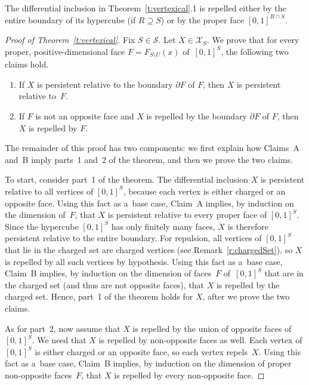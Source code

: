 \begin{Remark}
\label{r:chargedSet}
The dif\/ferential inclusion in Theorem~\ref{t:vertexical}.1 is repelled either by the entire boundary of its hypercube
(if $R\supseteq S$) or by the proper face $[0,1]^{R\cap S}$.
\end{Remark}
\begin{proof}[Proof of Theorem~\ref{t:vertexical}] Fix $S\in\mathcal S$.
Let $X\in\mathcal X_S$.
We prove that for every proper, positive-dimensional face $F=F_{S\setminus U}(x)$ of~$[0,1]^S$, the following two
claims hold.
\begin{enumerate}\itemsep=-0.5pt
 \item[A.] If $X$ is persistent relative to the boundary $\partial F$ of $F$, then $X$ is persistent relative to~$F$.
\item[B.]  If $F$ is not an opposite face and $X$ is repelled by the boundary $\partial F$ of $F$, then $X$ is repelled by
$F$.
\end{enumerate}
The remainder of this proof has two components: we f\/irst explain how Claims~A and~B imply parts~1 and~2 of the
theorem, and then we prove the two claims.

To start, consider part~1 of the theorem.
The dif\/ferential inclusion $X$ is persistent relative to all vertices of $[0,1]^S$, because each vertex is either
charged or an opposite face.
Using this fact as a~base case, Claim~A implies, by induction on the dimension of~$F$, that $X$ is persistent relative
to every proper face of $[0,1]^S$.
Since the hypercube $[0,1]^S$ has only f\/initely many faces, $X$ is therefore persistent relative to the entire
boundary.
For repulsion, all vertices of $[0,1]^S$ that lie in the charged set are charged vertices (see
Remark~\ref{r:chargedSet}), so $X$ is repelled by all such vertices by hypothesis.
Using this fact as a~base case, Claim~B implies, by induction on the dimension of faces~$F$ of~$[0,1]^S$ that are in
the charged set (and thus are not opposite faces), that $X$ is repelled by the charged set.
Hence, part~1 of the theorem holds for $X$, after we prove the two claims.

As for part~2, now assume that $X$ is repelled by the union of opposite faces of\/~$[0,1]^S$.
We need that $X$ is repelled by non-opposite faces as well.
Each vertex of $[0,1]^S$ is either charged or an opposite face, so each vertex repels~$X$.
Using this fact as a~base case, Claim~B implies, by induction on the dimension of proper non-opposite faces~$F$, that
$X$ is repelled by every non-opposite face.


\end{proof}
